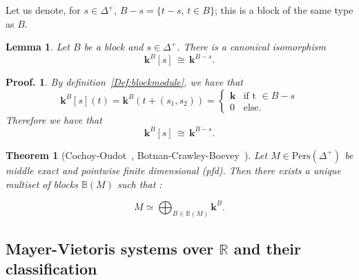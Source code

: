\documentclass[a4paper, english, 11pt]{article}
\newcommand{\kk}[0]{\textbf{k}}
\newcommand{\0}{\vec{0}}
\newcommand{\R}[0]{\mathbb{R}}
\newcommand{\Pers}[0]{\text{Pers}}
\newtheorem*{pf}{Proof.} }
\newtheorem{lem}[prop]{Lemma}
\newtheorem{thm}[prop]{Theorem}
\begin{document}
Let us denote, for $s\in \Delta^+$, $B -s=\{ t -s, \, t\in B\}$; this is a block of the same type as $B$.
\begin{lem}\label{L:shiftofBlock}
 Let $B$ be a block and $s\in \Delta^+$. There is a canonical isomorphism 
 $$\kk^B[s] \, \cong \, \kk^{B-s}. $$
\end{lem}
\begin{pf}
 By definition~\ref{Def:blockmodule}, we have that 
 $$\kk^B[s](t)= \kk^B(t+(s_1, s_2)) = \left\{ \begin{array}{ll} 
\kk & \text{if t }\in B -s \\
0 & \text{else.}\end{array}\right.$$
Therefore we have that $$\kk^B[s] \, \cong \, \kk^{B-s}.$$
\end{pf}
\begin{thm}[Cochoy-Oudot~\cite{CO17}, Botnan-Crawley-Boevey~\cite{BotCra18}] \label{thm:exactdecomp}
Let $M\in \Pers(\Delta^+)$ be middle exact and pointwise finite dimensional (pfd). Then there exists a unique multiset of blocks $\mathbb{B}(M)$ such that : 

$$M \simeq \bigoplus_{B\in \mathbb{B}(M)} \kk^B. $$
\end{thm}




\subsection{Mayer-Vietoris systems over $\R$ and their classification}\label{S:ClassMVSystems}
\end{document}
